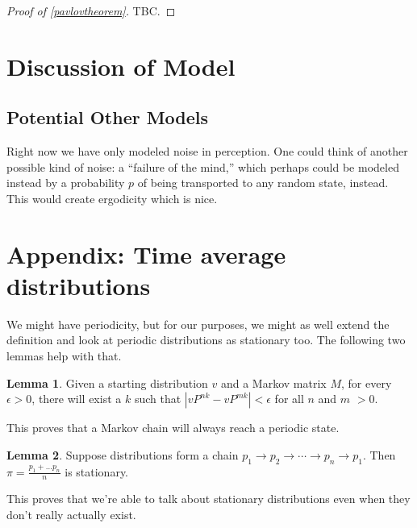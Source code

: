 \documentclass[11pt]{amsart}
\theoremstyle{definition}
\newtheorem{lemma}{Lemma}
\theoremstyle{remark}
\begin{document}
    \begin{proof}[Proof of \cref{pavlovtheorem}]

      TBC.

    \end{proof}




    \section{Discussion of Model}



    \subsection{Potential Other Models}

    Right now we have only modeled noise in perception. One could think of another possible kind of noise: a ``failure of the mind,'' which perhaps could be modeled instead by a probability $p$ of being transported to any random state, instead. This would create ergodicity which is nice.

    \section{Appendix: Time average distributions}

    We might have periodicity, but for our purposes, we might as well extend the definition and look at periodic distributions as stationary too. The following two lemmas help with that.

    \begin{lemma}
      Given a starting distribution $v$ and a Markov matrix $M$, for every $\epsilon > 0$, there will exist a $k$ such that $|vP^{nk} - vP^{mk}| < \epsilon$ for all $n$ and $m$ $> 0$.
    \end{lemma}

    This proves that a Markov chain will always reach a periodic state.

    \begin{lemma}
      Suppose distributions form a chain $p_1 \to p_2 \to \cdots \to p_n \to p_1$. Then $\pi = \frac{p_1 + \ldots p_n}{n}$ is stationary.
    \end{lemma}

    This proves that we're able to talk about stationary distributions even when they don't really actually exist.
\end{document}
